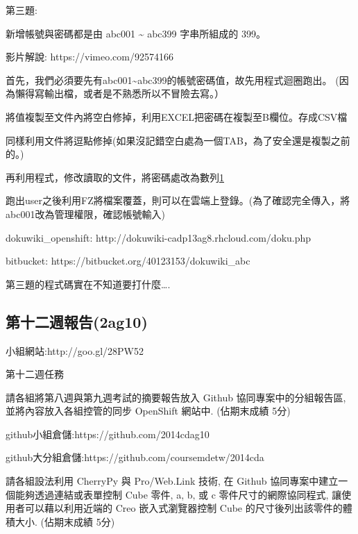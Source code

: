 \documentclass[]{article}
\begin{document}
第三題:

新增帳號與密碼都是由 abc001 \textasciitilde{} abc399 字串所組成的 399。

影片解說: https://vimeo.com/92574166

首先，我們必須要先有abc001\textasciitilde{}abc399的帳號密碼值，故先用程式迴圈跑出。
(因為懶得寫輸出檔，或者是不熟悉所以不冒險去寫。）

將值複製至文件內將空白修掉，利用EXCEL把密碼在複製至B欄位。存成CSV檔

同樣利用文件將逗點修掉(如果沒記錯空白處為一個TAB，為了安全還是複製之前的。)

再利用程式，修改讀取的文件，將密碼處改為數列\href{數列第一資料行位為{[}0{]}，第二資料故為{[}1{]}}{1}

跑出user之後利用FZ將檔案覆蓋，則可以在雲端上登錄。(為了確認完全傳入，將abc001改為管理權限，確認帳號輸入)

dokuwiki\_openshift: http://dokuwiki-cadp13ag8.rhcloud.com/doku.php

bitbucket: https://bitbucket.org/40123153/dokuwiki\_abc

第三題的程式碼實在不知道要打什麼\ldots{}.

\subsection{第十二週報告(2ag10)}\label{ux7b2cux5341ux4e8cux9031ux5831ux544a2ag10}

小組網站:http://goo.gl/28PW52

第十二週任務

請各組將第八週與第九週考試的摘要報告放入 Github 協同專案中的分組報告區,
並將內容放入各組控管的同步 OpenShift 網站中. (佔期末成績 5分)

github小組倉儲:https://github.com/2014cdag10

github大分組倉儲:https://github.com/coursemdetw/2014cda

請各組設法利用 CherryPy 與 Pro/Web.Link 技術, 在 Github
協同專案中建立一個能夠透過連結或表單控制 Cube 零件, a, b, 或 c
零件尺寸的網際協同程式, 讓使用者可以藉以利用近端的 Creo 嵌入式瀏覽器控制
Cube 的尺寸後列出該零件的體積大小. (佔期末成績 5分)
\end{document}
